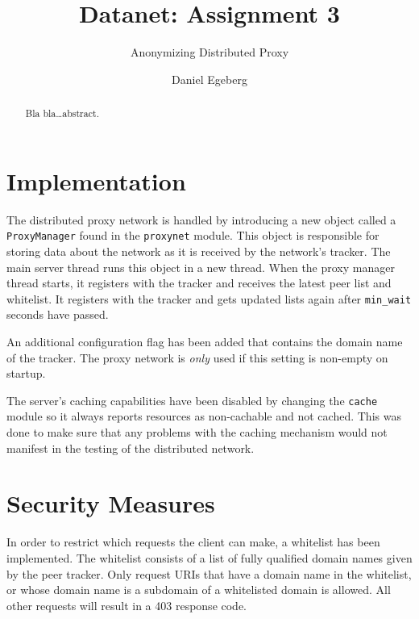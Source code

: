 \documentclass{sig-alternate}
\begin{document}
\title{Datanet: Assignment 3}
\subtitle{Anonymizing Distributed Proxy}


\author{
\alignauthor
    Daniel Egeberg\\
}

\maketitle

\begin{abstract}
    Bla bla\ldots abstract.
\end{abstract}

\section{Implementation}
\label{sec:implementation}

The distributed proxy network is handled by introducing a new object called
a \verb+ProxyManager+ found in the \verb+proxynet+ module. This object is
responsible for storing data about the network as it is received by the
network's tracker. The main server thread runs this object in a new thread.
When the proxy manager thread starts, it registers with the tracker and
receives the latest peer list and whitelist. It registers with the tracker and
gets updated lists again after \verb+min_wait+ seconds have passed.

An additional configuration flag has been added that contains the domain name
of the tracker. The proxy network is \emph{only} used if this setting is
non-empty on startup.

The server's caching capabilities have been disabled by changing the
\verb+cache+ module so it always reports resources as non-cachable and
not cached. This was done to make sure that any problems with the caching
mechanism would not manifest in the testing of the distributed network.


\section{Security Measures}
\label{sec:security}

In order to restrict which requests the client can make, a whitelist has been
implemented. The whitelist consists of a list of fully qualified domain names
given by the peer tracker. Only request URIs that have a domain name in the
whitelist, or whose domain name is a subdomain of a whitelisted domain is
allowed. All other requests will result in a 403 response code.
\end{document}
